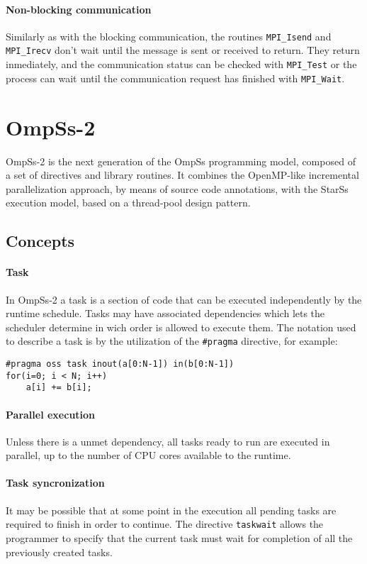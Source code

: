 \paragraph{Non-blocking communication} Similarly as with the blocking
communication, the routines \texttt{MPI\_Isend} and \texttt{MPI\_Irecv} don't
wait until the message is sent or received to return. They return inmediately,
and the communication status can be checked with \texttt{MPI\_Test} or the
process can wait until the communication request has finished with
\texttt{MPI\_Wait}.

\section{OmpSs-2}

OmpSs-2 is the next generation of the OmpSs programming model, composed of a set
of directives and library routines. It combines the OpenMP-like incremental 
parallelization approach, by means of source code annotations, with the StarSs 
execution model, based on a thread-pool design pattern.

\subsection{Concepts}

\paragraph{Task} In OmpSs-2 a task is a section of code that can be executed
independently by the runtime schedule. Tasks may have associated dependencies
which lets the scheduler determine in wich order is allowed to execute them. The 
notation used to describe a task is by the utilization of the
\texttt{\#pragma} directive, for example:
%
\begin{lstlisting}
#pragma oss task inout(a[0:N-1]) in(b[0:N-1])
for(i=0; i < N; i++)
	a[i] += b[i];
\end{lstlisting}
%
\paragraph{Parallel execution} Unless there is a unmet dependency, all tasks 
ready to run are executed in parallel, up to the number of CPU cores available 
to the runtime.

\paragraph{Task syncronization} It may be possible that at some point in the
execution all pending tasks are required to finish in order to continue. The
directive \texttt{taskwait} allows the programmer to specify that the current 
task must wait for completion of all the previously created tasks.

